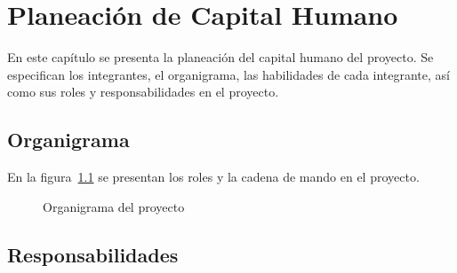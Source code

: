 \chapter{Planeación de Capital Humano}	
\label{cap:capHumano}

	En este capítulo se presenta la planeación del capital humano del proyecto. Se especifican los integrantes, el organigrama, las habilidades de cada integrante, así como sus roles y responsabilidades en el proyecto.

\section{Organigrama}	


En la figura~\ref{fig:organigrama} se presentan los roles y la cadena de mando en el proyecto. 

\begin{figure}[htbp]
	\begin{center}
		\caption{Organigrama del proyecto}
		\label{fig:organigrama}
	\end{center}
\end{figure}


\section{Responsabilidades}



